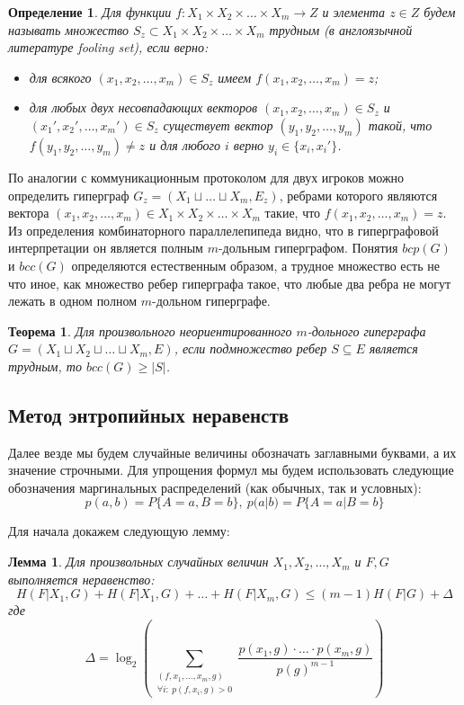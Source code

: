 \documentclass[a4paper]{article}
\newtheorem*{mdefinition}{Определение}
\newtheorem{mtheorem}{Теорема}[section]
\newtheorem{mlemma}{Лемма}[section]
\begin{document}
\begin{mdefinition}
	Для функции $f: X_1\times X_2\times\ldots\times X_m \rightarrow Z$ и элемента $z\in Z$ будем называть множество 
	$S_z\subset X_1\times X_2\times\ldots\times X_m$ трудным (в англоязычной литературе fooling set), если верно:
	\begin{itemize}[noitemsep]
		\item для всякого $(x_1, x_2, \ldots, x_m)\in S_z$ имеем $f(x_1, x_2, \ldots, x_m) = z$;
		\item для любых двух несовпадающих векторов $(x_1, x_2,\ldots, x_m)\in S_z$ и $(x_1', x_2',\ldots, x_m')\in S_z$ 
		существует вектор $(y_1, y_2,\ldots, y_m)$ такой, что $f(y_1, y_2,\ldots, y_m) \neq z$ и для любого 
		$i$ верно $y_i \in \{x_i, x_i'\}$.
	\end{itemize}
\end{mdefinition}

По аналогии с коммуникационным протоколом для двух игроков можно определить гиперграф 
$G_z = (X_1\sqcup\ldots\sqcup X_m, E_z)$, ребрами которого являются вектора $(x_1, x_2,\ldots, x_m) 
\in X_1\times X_2\times\ldots\times X_m$ такие, что $f(x_1, x_2,\ldots, x_m) = z$. Из определения 
комбинаторного параллелепипеда видно, что в гиперграфовой интерпретации он является полным $m$-дольным 
гиперграфом. Понятия $bcp(G)$ и $bcc(G)$ определяются естественным образом, а трудное множество есть 
не что иное, как множество ребер гиперграфа такое, что любые два ребра не могут лежать в одном полном $m$-дольном гиперграфе.  
	
\begin{mtheorem}
    Для произвольного неориентированного $m$-дольного гиперграфа $G = (X_1\sqcup X_2\sqcup\ldots\sqcup X_m, E)$, 
    если подмножество ребер $S \subseteq E$ является трудным, то $bcc(G) \geq |S|$.
\end{mtheorem}

\subsection{Метод энтропийных неравенств}

Далее везде мы будем случайные величины обозначать заглавными буквами, а их значение строчными. Для упрощения 
формул мы будем использовать следующие обозначения маргинальных распределений (как обычных, так и условных):
$$p(a,b) = P\{A=a, B=b\},\ p(a|b) = P\{A=a | B=b\}$$

Для начала докажем следующую лемму:
\begin{mlemma}
    Для произвольных случайных величин $X_1, X_2,\ldots, X_m$ и $F, G$ выполняется неравенство:
    $$H(F|X_1,G) + H(F|X_1,G) + \ldots + H(F|X_m,G) \leq (m-1)H(F|G) + \Delta$$ где 
    $$\Delta = \log_2\left(\sum\limits_{\substack{(f,x_1,\ldots,x_m,g) \\ \forall i:\ p(f,x_i,g)>0}}\frac{p(x_1,g)\cdot\ldots\cdot p(x_m,g)}{p(g)^{m-1}}\right)$$
\end{mlemma}
\end{document}
